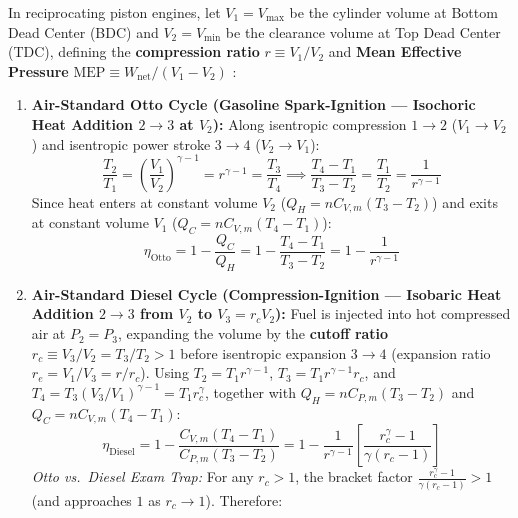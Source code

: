 In reciprocating piston engines, let $V_1 = V_{\max}$ be the cylinder volume at Bottom Dead Center (BDC) and $V_2 = V_{\min}$ be the clearance volume at Top Dead Center (TDC), defining the \textbf{compression ratio} $r \equiv V_1/V_2$ and \textbf{Mean Effective Pressure} $\mathrm{MEP} \equiv W_{\mathrm{net}}/(V_1 - V_2)$ :

\begin{formulacard}
\begin{enumerate}
  \item \textbf{Air-Standard Otto Cycle (Gasoline Spark-Ignition — Isochoric Heat Addition $2\to 3$ at $V_2$):}
  Along isentropic compression $1\to 2$ ($V_1\to V_2$) and isentropic power stroke $3\to 4$ ($V_2\to V_1$):
  \[
    \frac{T_2}{T_1} = \left(\frac{V_1}{V_2}\right)^{\gamma - 1} = r^{\gamma - 1} = \frac{T_3}{T_4} \implies \frac{T_4 - T_1}{T_3 - T_2} = \frac{T_1}{T_2} = \frac{1}{r^{\gamma - 1}}
  \]
  Since heat enters at constant volume $V_2$ ($Q_H = nC_{V,m}(T_3 - T_2)$) and exits at constant volume $V_1$ ($Q_C = nC_{V,m}(T_4 - T_1)$):
  \begin{equation}\label{eq:09:otto}
    \boxed{\eta_{\mathrm{Otto}} = 1 - \frac{Q_C}{Q_H} = 1 - \frac{T_4 - T_1}{T_3 - T_2} = 1 - \frac{1}{r^{\gamma - 1}}}
  \end{equation}
  \item \textbf{Air-Standard Diesel Cycle (Compression-Ignition — Isobaric Heat Addition $2\to 3$ from $V_2$ to $V_3 = r_c V_2$):}
  Fuel is injected into hot compressed air at $P_2 = P_3$, expanding the volume by the \textbf{cutoff ratio} $r_c \equiv V_3/V_2 = T_3/T_2 > 1$ before isentropic expansion $3\to 4$ (expansion ratio $r_e = V_1/V_3 = r/r_c$). Using $T_2 = T_1 r^{\gamma-1}$, $T_3 = T_1 r^{\gamma-1} r_c$, and $T_4 = T_3(V_3/V_1)^{\gamma-1} = T_1 r_c^\gamma$, together with $Q_H = nC_{P,m}(T_3 - T_2)$ and $Q_C = nC_{V,m}(T_4 - T_1)$:
  \begin{equation}\label{eq:09:diesel}
    \boxed{\eta_{\mathrm{Diesel}} = 1 - \frac{C_{V,m}(T_4 - T_1)}{C_{P,m}(T_3 - T_2)} = 1 - \frac{1}{r^{\gamma - 1}}\left[\frac{r_c^\gamma - 1}{\gamma(r_c - 1)}\right]}
  \end{equation}
  \emph{Otto vs.\ Diesel Exam Trap:} For any $r_c > 1$, the bracket factor $\frac{r_c^\gamma - 1}{\gamma(r_c - 1)} > 1$ (and approaches $1$ as $r_c \to 1$). Therefore:

\end{enumerate}
\end{formulacard}
